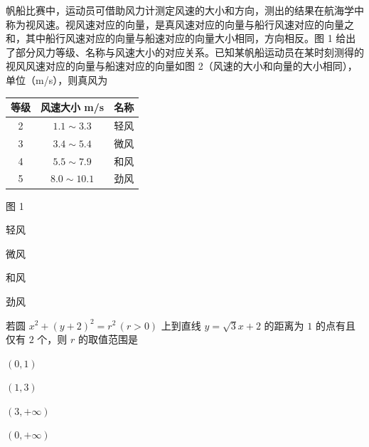 \documentclass{exam-zh}
\begin{document}
\begin{question}
帆船比赛中，运动员可借助风力计测定风速的大小和方向，测出的结果在航海学中称为视风速。视风速对应的向量，是真风速对应的向量与船行风速对应的向量之和，其中船行风速对应的向量与船速对应的向量大小相同，方向相反。图 1 给出了部分风力等级、名称与风速大小的对应关系。已知某帆船运动员在某时刻测得的视风风速对应的向量与船速对应的向量如图 2（风速的大小和向量的大小相同），单位（m/s），则真风为 \paren

\begin{center}
\begin{tabular}{|c|c|c|}
\hline
等级 & 风速大小 m/s & 名称 \\
\hline
2 & $1.1\sim 3.3$ & 轻风 \\
\hline
3 & $3.4\sim 5.4$ & 微风 \\
\hline
4 & $5.5\sim 7.9$ & 和风 \\
\hline
5 & $8.0\sim 10.1$ & 劲风 \\
\hline
\end{tabular}

\vspace{4pt}
{\footnotesize 图 1}
\end{center}

\begin{center}
\end{center}

\begin{choices}
  \item 轻风
  \item 微风
  \item 和风
  \item 劲风
\end{choices}
\end{question}

\begin{question}
若圆 $x^{2}+(y+2)^{2}=r^{2}\,(r>0)$ 上到直线 $y=\sqrt{3}x+2$ 的距离为 $1$ 的点有且仅有 $2$ 个，则 $r$ 的取值范围是 \paren
\begin{choices}
  \item $(0,1)$
  \item $(1,3)$
  \item $(3,+\infty)$
  \item $(0,+\infty)$
\end{choices}
\end{question}
\end{document}

